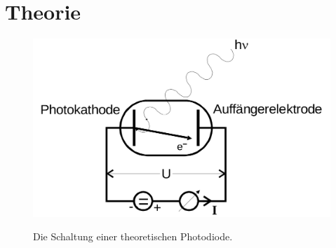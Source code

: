 
\section{Theorie}
\label{sec:Theorie}

\begin{figure}
	\centering
	\caption{Die Schaltung einer theoretischen Photodiode.}
	\includegraphics[width=\linewidth-70pt,height=\textheight-70pt,keepaspectratio]{content/Bilder/photodiode.png}
	\label{fig:photodiode}
\end{figure}

